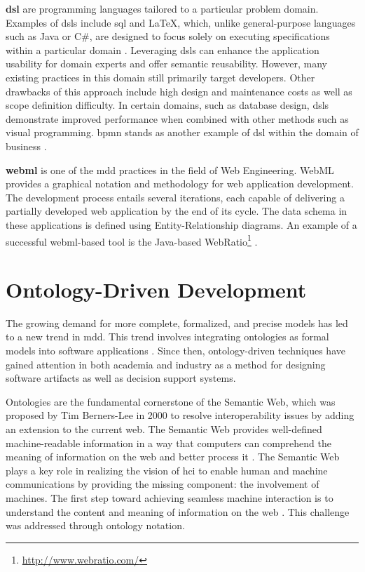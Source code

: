 \textbf{\gls{dsl}} are programming languages
tailored to a particular problem domain. Examples of \gls{dsl}s include \gls{sql}
and LaTeX, which, unlike general-purpose languages such as Java or C\#,
are designed to focus solely on executing specifications within a
particular domain \autocite{Ceh2010}. Leveraging \gls{dsl}s can enhance
the application usability for domain experts and offer semantic
reusability. However, many existing practices in this domain still
primarily target developers. Other drawbacks of this approach include
high design and maintenance costs as well as scope definition
difficulty. In certain domains, such as database design, \gls{dsl}s
demonstrate improved performance when combined with other methods such
as visual programming. \gls{bpmn}
stands as another example of \gls{dsl} within the domain of business \autocite{Imran2013}.

\textbf{\gls{webml}} is one of the \gls{mdd} practices in
the field of Web Engineering. WebML provides a graphical notation and
methodology for web application development. The development process
entails several iterations, each capable of delivering a partially
developed web application by the end of its cycle. The data schema in
these applications is defined using Entity-Relationship diagrams. An
example of a successful \gls{webml}-based tool is the Java-based
WebRatio\footnote{\url{http://www.webratio.com/}} \autocite{Tschudnowsky2016}.


\hypertarget{ontology-driven-dev}{%
\section{Ontology-Driven Development}\label{ontology-driven-dev}}

The growing demand for more complete, formalized, and precise models has
led to a new trend in \gls{mdd}. This trend
involves integrating ontologies as formal models into software
applications \autocite{Haav2018}. Since then, ontology-driven techniques
have gained attention in both academia and industry as a method for
designing software artifacts as well as decision support systems.

Ontologies are the fundamental cornerstone of the Semantic Web, which was
proposed by Tim Berners-Lee in 2000 to resolve interoperability
issues by adding an extension to the current web. The Semantic Web
provides well-defined machine-readable information in a way that computers
can comprehend the meaning of information on the web and better process it
\autocite{Kalou2013}. The Semantic Web plays a key role in realizing the vision of \gls{hci} to enable human and machine communications by providing the missing component: the involvement of machines. The
first step toward achieving seamless machine interaction is to
understand the content and meaning of information on the web
\autocite{Berners-Lee1998}. This challenge was addressed through ontology notation.

